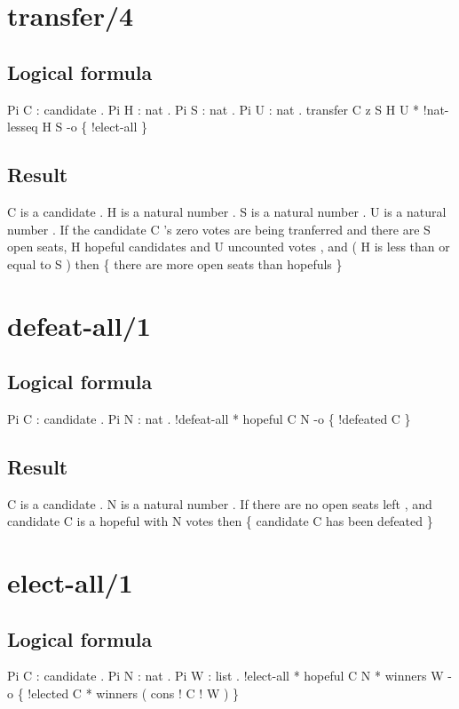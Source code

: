 \section{transfer/4}
\subsection{Logical formula}
\begin{texto2}
	Pi C : candidate . Pi H : nat . Pi S : nat . Pi U : nat . transfer C z S H U * !nat-lesseq H S -o \{ !elect-all \}
\end{texto2}

\subsection{Result}
\begin{texto2}
	C is a candidate . H is a natural number . S is a natural number . U is a natural number . If the candidate C 's zero votes are being tranferred and there are S open seats, H hopeful candidates and U uncounted votes , and ( H is less than or equal to S ) then \{ there are more open seats than hopefuls \}
\end{texto2}

\section{defeat-all/1}
\subsection{Logical formula}
\begin{texto2}
	Pi C : candidate . Pi N : nat . !defeat-all * hopeful C N -o \{ !defeated C \}
\end{texto2}

\subsection{Result}
\begin{texto2}
	C is a candidate . N is a natural number . If there are no open seats left , and candidate C is a hopeful with N votes then \{ candidate C has been defeated \}
\end{texto2}

\section{elect-all/1}
\subsection{Logical formula}
\begin{texto2}
	Pi C : candidate . Pi N : nat . Pi W : list . !elect-all * hopeful C N * winners W -o \{ !elected C * winners ( cons ! C ! W ) \}
\end{texto2}

